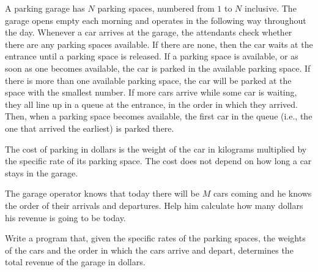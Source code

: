 A parking garage has $N$ parking spaces, numbered from $1$ to $N$ inclusive. The garage opens empty each morning and operates in the following way throughout the day. Whenever a car arrives at the garage, the attendants check whether there are any parking spaces available. If there are none, then the car waits at the entrance until a parking space is released. If a parking space is available, or as soon as one becomes available, the car is parked in the available parking space. If there is more than one available parking space, the car will be parked at the space with the smallest number. If more cars arrive while some car is waiting, they all line up in a queue at the entrance, in the order in which they arrived. Then, when a parking space becomes available, the first car in the queue (i.e., the one that arrived the earliest) is parked there. 

The cost of parking in dollars is the weight of the car in kilograms multiplied by the specific rate of its parking space. The cost does not depend on how long a car stays in the garage. 

The garage operator knows that today there will be $M$ cars coming and he knows the order of their arrivals and departures. Help him calculate how many dollars his revenue is going to be today.

Write a program that, given the specific rates of the parking spaces, the weights of the cars and the order in which the cars arrive and depart, determines the total revenue of the garage in dollars. 